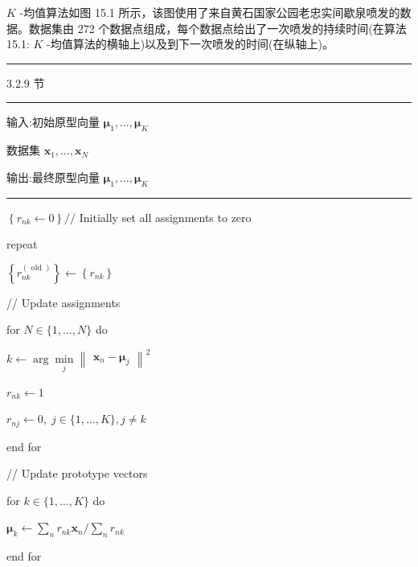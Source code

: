 \documentclass[10pt]{article}
\newcommand{\HRule}{\begin{center}\rule{0.9\linewidth}{0.2mm}\end{center}}
\begin{document}
\(K\) -均值算法如图 15.1 所示，该图使用了来自黄石国家公园老忠实间歇泉喷发的数据。数据集由 272 个数据点组成，每个数据点给出了一次喷发的持续时间(在算法 15.1: \(K\) -均值算法的横轴上)以及到下一次喷发的时间(在纵轴上)。

\HRule

3.2.9 节

\HRule

输入:初始原型向量 \({\mathbf{\mu }}_{1},\ldots ,{\mathbf{\mu }}_{K}\)

数据集 \({\mathbf{x}}_{1},\ldots ,{\mathbf{x}}_{N}\)

输出:最终原型向量 \({\mathbf{\mu }}_{1},\ldots ,{\mathbf{\mu }}_{K}\)

\HRule

\(\left\{  {{r}_{nk} \leftarrow  0}\right\}  //\) Initially set all assignments to zero

repeat

\hspace*{1em} \(\left\{  {r}_{nk}^{\left( \text{ old }\right) }\right\}   \leftarrow  \left\{  {r}_{nk}\right\}\)

\hspace*{1em} // Update assignments

\hspace*{1em} for \(N \in  \{ 1,\ldots ,N\}\) do

\hspace*{2em} \(k \leftarrow  \arg \mathop{\min }\limits_{j}{\begin{Vmatrix}{\mathbf{x}}_{n} - {\mathbf{\mu }}_{j}\end{Vmatrix}}^{2}\)

\hspace*{3em} \({r}_{nk} \leftarrow  1\)

\hspace*{2em} \({r}_{nj} \leftarrow  0,\;j \in  \{ 1,\ldots ,K\} ,j \neq  k\)

\hspace*{1em} end for

\hspace*{1em} // Update prototype vectors

\hspace*{1em} for \(k \in  \{ 1,\ldots ,K\}\) do

\hspace*{2em} \({\mathbf{\mu }}_{k} \leftarrow  \mathop{\sum }\limits_{n}{r}_{nk}{\mathbf{x}}_{n}/\mathop{\sum }\limits_{n}{r}_{nk}\)

\hspace*{1em} end for
\end{document}
